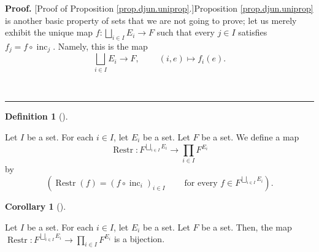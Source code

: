 \documentclass[numbers=enddot,12pt,final,onecolumn,notitlepage,abstracton]{scrartcl}
\theoremstyle{definition}
\newtheorem{defi}[theo]{Definition}
\newenvironment{definition}[1][]
{\begin{defi}[#1]\begin{leftbar}}
{\end{leftbar}\end{defi}}
\newtheorem{coro}[theo]{Corollary}
\newenvironment{corollary}[1][]
{\begin{coro}[#1]\begin{leftbar}}
{\end{leftbar}\end{coro}}
\newenvironment{proof}[1][Proof]{\noindent\textbf{#1.} }{\ \rule{0.5em}{0.5em}}
\let\prodnonlimits\prod
\renewcommand{\prod}{\prodnonlimits\limits}
\newenvironment{verlong}{}{}
\begin{document}
\begin{verlong}
\begin{footnotesize}
\begin{proof}
[Proof of Proposition \ref{prop.djun.uniprop}.]Proposition
\ref{prop.djun.uniprop} is another basic property of sets that we are not
going to prove; let us merely exhibit the unique map $f:\bigsqcup_{i\in
I}E_{i}\rightarrow F$ such that every $j\in I$ satisfies $f_{j}=f\circ
\operatorname*{inc}\nolimits_{j}$. Namely, this is the map
\[
\bigsqcup_{i\in I}E_{i}\rightarrow F,\ \ \ \ \ \ \ \ \ \ \left(  i,e\right)
\mapsto f_{i}\left(  e\right)  .
\]

\end{proof}

\begin{definition}
\label{def.djun.restr}Let $I$ be a set. For each $i\in I$, let $E_{i}$ be a
set. Let $F$ be a set. We define a map%
\[
\operatorname*{Restr}:F^{\bigsqcup_{i\in I}E_{i}}\rightarrow\prod_{i\in
I}F^{E_{i}}%
\]
by%
\[
\left(  \operatorname*{Restr}\left(  f\right)  =\left(  f\circ
\operatorname*{inc}\nolimits_{i}\right)  _{i\in I}%
\ \ \ \ \ \ \ \ \ \ \text{for every }f\in F^{\bigsqcup_{i\in I}E_{i}}\right)
.
\]

\end{definition}

\begin{corollary}
\label{cor.djun.restr}Let $I$ be a set. For each $i\in I$, let $E_{i}$ be a
set. Let $F$ be a set. Then, the map $\operatorname*{Restr}:F^{\bigsqcup_{i\in
I}E_{i}}\rightarrow\prod_{i\in I}F^{E_{i}}$ is a bijection.
\end{corollary}


\end{footnotesize}
\end{verlong}
\end{document}
